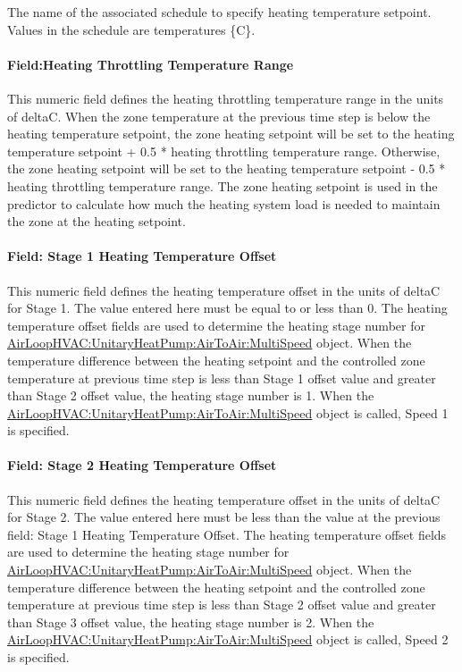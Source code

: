 The name of the associated schedule to specify heating temperature setpoint. Values in the schedule are temperatures \{C\}.

\paragraph{Field:Heating Throttling Temperature Range}\label{fieldheating-throttling-temperature-range}

This numeric field defines the heating throttling temperature range in the units of deltaC. When the zone temperature at the previous time step is below the heating temperature setpoint, the zone heating setpoint will be set to the heating temperature setpoint + 0.5 * heating throttling temperature range. Otherwise, the zone heating setpoint will be set to the heating temperature setpoint - 0.5 * heating throttling temperature range. The zone heating setpoint is used in the predictor to calculate how much the heating system load is needed to maintain the zone at the heating setpoint.

\paragraph{Field: Stage 1 Heating Temperature Offset}\label{field-stage-1-heating-temperature-offset}

This numeric field defines the heating temperature offset in the units of deltaC for Stage 1. The value entered here must be equal to or less than 0. The heating temperature offset fields are used to determine the heating stage number for \hyperref[airloophvacunitaryheatpumpairtoairmultispeed]{AirLoopHVAC:UnitaryHeatPump:AirToAir:MultiSpeed} object. When the temperature difference between the heating setpoint and the controlled zone temperature at previous time step is less than Stage 1 offset value and greater than Stage 2 offset value, the heating stage number is 1. When the \hyperref[airloophvacunitaryheatpumpairtoairmultispeed]{AirLoopHVAC:UnitaryHeatPump:AirToAir:MultiSpeed} object is called, Speed 1 is specified.

\paragraph{Field: Stage 2 Heating Temperature Offset}\label{field-stage-2-heating-temperature-offset}

This numeric field defines the heating temperature offset in the units of deltaC for Stage 2. The value entered here must be less than the value at the previous field: Stage 1 Heating Temperature Offset. The heating temperature offset fields are used to determine the heating stage number for \hyperref[airloophvacunitaryheatpumpairtoairmultispeed]{AirLoopHVAC:UnitaryHeatPump:AirToAir:MultiSpeed} object. When the temperature difference between the heating setpoint and the controlled zone temperature at previous time step is less than Stage 2 offset value and greater than Stage 3 offset value, the heating stage number is 2. When the \hyperref[airloophvacunitaryheatpumpairtoairmultispeed]{AirLoopHVAC:UnitaryHeatPump:AirToAir:MultiSpeed} object is called, Speed 2 is specified.

